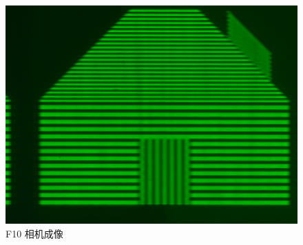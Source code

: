 \documentclass{ctexart}
\begin{document}
\begin{figure}[H]
\begin{minipage}[b]{0.3\textwidth}
    \includegraphics[width=\textwidth]{pictures/F10-mask-Ex19.png}
    \caption{F10 相机成像}
  \end{minipage}
\end{figure}
\end{document}
